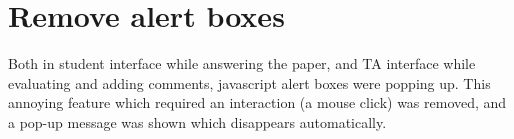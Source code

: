 \section{Remove alert boxes}
Both in student interface while answering the paper, and TA interface while evaluating and adding comments, javascript alert boxes were popping up. This annoying feature which required an interaction (a mouse click) was removed, and a pop-up message was shown which disappears automatically.
